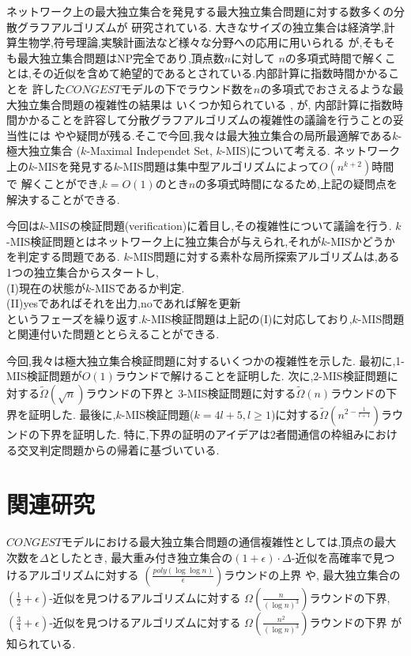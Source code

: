\documentclass[12]{thesis}
\theoremstyle{definition}
\begin{document}
ネットワーク上の最大独立集合を発見する最大独立集合問題に対する数多くの分散グラフアルゴリズムが
研究されている.
大きなサイズの独立集合は経済学,計算生物学,符号理論,実験計画法など様々な分野への応用に用いられる \cite{kawarabayashi2019improved} が,そもそも最大独立集合問題はNP完全であり,頂点数$n$に対して
$n$の多項式時間で解くことは,その近似を含めて絶望的であるとされている.内部計算に指数時間かかることを
許した$CONGEST$モデルの下でラウンド数を$n$の多項式でおさえるような最大独立集合問題の複雑性の結果は
いくつか知られている \cite{kawarabayashi2019improved},  \cite{efron2020beyond}が,
内部計算に指数時間かかることを許容して分散グラフアルゴリズムの複雑性の議論を行うことの妥当性には
やや疑問が残る.そこで今回,我々は最大独立集合の局所最適解である$k$-極大独立集合
($k$-Maximal Independet Set, $k$-MIS)について考える.
ネットワーク上の$k$-MISを発見する$k$-MIS問題は集中型アルゴリズムによって$O(n^{k + 2})$時間で
解くことができ,$k = O(1)$のとき$n$の多項式時間になるため,上記の疑問点を解決することができる.

今回は$k$-MISの検証問題(verification)に着目し,その複雑性について議論を行う.
$k$-MIS検証問題とはネットワーク上に独立集合が与えられ,それが$k$-MISかどうかを判定する問題である.
$k$-MIS問題に対する素朴な局所探索アルゴリズムは,ある1つの独立集合からスタートし, \\
(I)現在の状態が$k$-MISであるか判定. \\
(II)yesであればそれを出力,noであれば解を更新 \\
というフェーズを繰り返す.$k$-MIS検証問題は上記の(I)に対応しており,$k$-MIS問題と関連付いた問題ととらえることができる.

今回,我々は極大独立集合検証問題に対するいくつかの複雑性を示した.
最初に,1-MIS検証問題が$O(1)$ラウンドで解けることを証明した.
次に,2-MIS検証問題に対する$\tilde{\Omega} (\sqrt{n})$ラウンドの下界と
3-MIS検証問題に対する$\tilde{\Omega} (n)$ラウンドの下界を証明した.
最後に,$k$-MIS検証問題($k = 4l + 5, l \geq 1$)に対する$\tilde{\Omega} (n^{2 - \frac{1}{l + 1}})$ラウンドの下界を証明した.
特に,下界の証明のアイデアは2者間通信の枠組みにおける交叉判定問題からの帰着に基づいている.

\section{関連研究} %
$CONGEST$モデルにおける最大独立集合問題の通信複雑性としては,頂点の最大次数を$\Delta$としたとき,
最大重み付き独立集合の$(1 + \epsilon) \cdot \Delta$-近似を高確率で見つけるアルゴリズムに対する
$(\frac{poly(\log \log n)}{\epsilon})$ラウンドの上界 \cite{kawarabayashi2019improved} や,
最大独立集合の$(\frac{1}{2} + \epsilon)$-近似を見つけるアルゴリズムに対する
$\Omega (\frac{n}{(\log n)^{3}})$ラウンドの下界,$(\frac{3}{4} + \epsilon)$-近似を見つけるアルゴリズムに対する
$\Omega (\frac{n^{2}}{(\log n)^{3}})$ラウンドの下界 \cite{efron2020beyond} が知られている.
 
\end{document}
